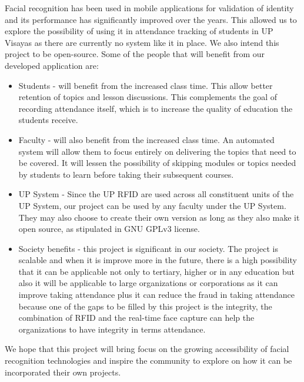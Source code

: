 	Facial recognition has been used in mobile applications for validation of identity and its performance has significantly improved over the years. This allowed us to explore the possibility of using it in attendance tracking of students in UP Visayas as there are currently no system like it in place. We also intend this project to be open-source. Some of the people that will benefit from our developed application are:
	
	\begin{itemize}
		\item Students - will benefit from the increased class time. This allow better retention of topics and lesson discussions. This complements the goal of recording attendance itself, which is to increase the quality of education the students receive.
	\end{itemize}
	\begin{itemize}
		\item Faculty - will also benefit from the increased class time. An automated system will allow them to focus entirely on delivering the topics that need to be covered. It will lessen the possibility of skipping modules or topics needed by students to learn before taking their subsequent courses. 
	\end{itemize}
	\begin{itemize}
		\item UP System - Since the UP RFID are used across all constituent units of the UP System, our project can be used by any faculty under the UP System. They may also choose to create their own version as long as they also make it open source, as stipulated in GNU GPLv3 license.
	\end{itemize}
	\begin{itemize}
		\item Society benefits - this project is significant in our society. The project is scalable and when it is improve more in the future, there is a high possibility that it can be applicable not only to tertiary, higher or in any education but also it will be applicable to large organizations or corporations as it can improve taking attendance plus it can reduce the fraud in taking attendance because one of the gaps to be filled by this project is the integrity, the combination of RFID and the real-time face capture can help the organizations to have integrity in terms attendance. 
		
	\end{itemize}
	
	
	We hope that this project will bring focus on the growing accessibility of facial recognition technologies and inspire the community to explore on how it can be incorporated their own projects.


